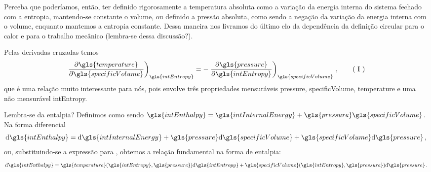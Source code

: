     Perceba que poderíamos, então, ter definido rigorosamente a temperatura
    absoluta como a variação da energia interna do sistema fechado com a
    entropia, mantendo-se  constante o volume, ou definido a pressão absoluta,
    como sendo a negação da variação da energia interna com o volume, enquanto
    mantemos a entropia constante.  Dessa maneira  nos livramos do último elo
    da dependência da definição circular para o calor e para o trabalho
    mecânico (lembra-se dessa discussão?).

    Pelas derivadas cruzadas temos
    \begin{equation} \label{eq:5.9}
        \ddxconsty{
            \gls{temperature}
        }{
            \gls{specificVolume}
        }{
            \gls{intEntropy}
        }
        =
        -
        \ddxconsty{
            \gls{pressure}
        }{
            \gls{intEntropy}
        }{
            \gls{specificVolume}
        }\,,
        \tag{\romannumber{1}}
    \end{equation}
    que é uma relação muito interessante para nós, pois envolve três
    propriedades mensuráveis \gls{pressure}, \gls{specificVolume},
    \gls{temperature} e uma não mensurável \gls{intEntropy}.

    Lembra-se da entalpia? Definimos como sendo
    $\gls{intEnthalpy} = \gls{intInternalEnergy} +
    \gls{pressure}\gls{specificVolume}$. Na forma diferencial
    \begin{equation} \label{eq:5.10}
        \diff{\gls{intEnthalpy}}
        =
        \diff{\gls{intInternalEnergy}}
        +
        \gls{pressure}
        \diff{\gls{specificVolume}}
        +
        \gls{specificVolume}
        \diff{\gls{pressure}}\,,
    \end{equation}
    ou, substituindo-se a expressão para ,
    obtemos a relação fundamental na forma de entalpia:
    \begin{equation} \label{eq:5.11}
        \diff{\gls{intEnthalpy}}
        =
        \gls{temperature}
        \functionOf{
            \gls{intEntropy},
            \gls{pressure}
        }
        \diff{\gls{intEntropy}}
        +
        \gls{specificVolume}
        \functionOf{
            \gls{intEntropy},
            \gls{pressure}
        }
        \diff{\gls{pressure}}\,.
    \end{equation}

